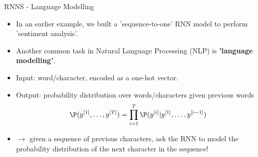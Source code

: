 \begin{vbframe}{RNNS - Language Modelling}
  \begin{itemize}
    \item In an earlier example, we built a 'sequence-to-one' RNN model to perform 'sentiment analysis'.
    \item Another common task in Natural Language Processing (NLP) is \textbf{'language modelling'}.
    \item Input: word/character, encoded as a one-hot vector.
    \item Output: probability distribution over words/characters given previous words $$\P(y^{[1]}, \dots, y^{[T]}) = \displaystyle \prod_{i=1}^{T} \P(y^{[i]}|y^{[1]}, \dots, y^{[i-1]})$$
    \item[] $\to$ given a sequence of previous characters, ask the RNN to model the probability distribution of the next character in the sequence!
   \end{itemize}
\end{vbframe}



